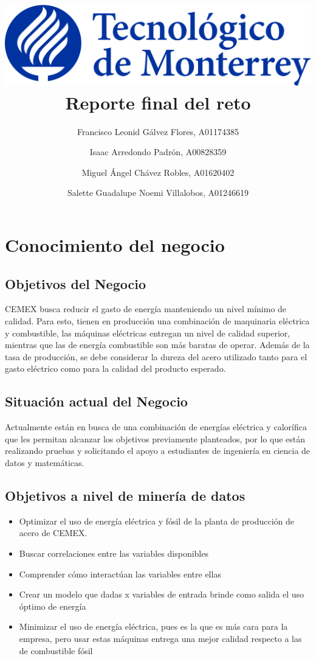 \documentclass{article}
\title{\includegraphics[scale=.15]{LogoTec.png}\\Reporte final del reto}
\author{ Francisco Leonid Gálvez Flores, A01174385\and
Isaac Arredondo Padrón, A00828359\and
Miguel Ángel Chávez Robles, A01620402\and
Salette Guadalupe Noemi Villalobos, A01246619}
\begin{document}
\renewcommand{\baselinestretch}{1.5}


\maketitle


\pagebreak

\tableofcontents

\pagebreak


\section{Conocimiento del negocio}

\subsection{Objetivos del Negocio}

CEMEX busca reducir el gasto de energía manteniendo un nivel mínimo de calidad. Para esto, tienen en producción una combinación de maquinaria eléctrica y combustible, las máquinas eléctricas entregan un nivel de calidad superior, mientras que las de energía combustible son más baratas de operar. Además de la tasa de producción, se debe considerar la dureza del acero utilizado tanto para el gasto eléctrico como para la calidad del producto esperado.

\subsection{Situación actual del Negocio}

Actualmente están en busca de una combinación de energías eléctrica y calorífica que les permitan alcanzar los objetivos previamente planteados, por lo que están realizando pruebas y solicitando el apoyo a estudiantes de ingeniería en ciencia de datos y matemáticas. \cite{reto}

\subsection{Objetivos a nivel de minería de datos}\label{objetivos}
\begin{itemize}
    \item Optimizar el uso de energía eléctrica y fósil de la planta de producción de acero de CEMEX.
    \item Buscar correlaciones entre las variables disponibles
    \item Comprender cómo interactúan las variables entre ellas
    \item Crear un modelo que dadas x variables de entrada brinde como salida el uso óptimo de energía 
    \item Minimizar el uso de energía eléctrica, pues es la que es más cara para la empresa, pero usar estas máquinas entrega una mejor calidad respecto a las de combustible fósil
\end{itemize}
\end{document}
